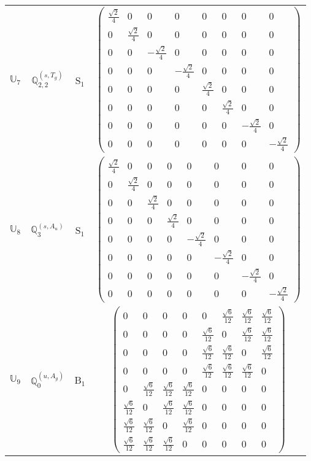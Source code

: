 \documentclass[fleqn,10pt,landscape]{article}
\begin{document}
\begin{itemize}
\begin{center}
\begin{longtable}{c|c|c|c}
$ \mathbb{U}_{7} $ & $\mathbb{Q}_{2,2}^{(s,T_{g})}$ & S$_{1}$ & $\begin{pmatrix} \frac{\sqrt{2}}{4} & 0 & 0 & 0 & 0 & 0 & 0 & 0 \\ 0 & \frac{\sqrt{2}}{4} & 0 & 0 & 0 & 0 & 0 & 0 \\ 0 & 0 & - \frac{\sqrt{2}}{4} & 0 & 0 & 0 & 0 & 0 \\ 0 & 0 & 0 & - \frac{\sqrt{2}}{4} & 0 & 0 & 0 & 0 \\ 0 & 0 & 0 & 0 & \frac{\sqrt{2}}{4} & 0 & 0 & 0 \\ 0 & 0 & 0 & 0 & 0 & \frac{\sqrt{2}}{4} & 0 & 0 \\ 0 & 0 & 0 & 0 & 0 & 0 & - \frac{\sqrt{2}}{4} & 0 \\ 0 & 0 & 0 & 0 & 0 & 0 & 0 & - \frac{\sqrt{2}}{4} \end{pmatrix}$ \\
$ \mathbb{U}_{8} $ & $\mathbb{Q}_{3}^{(s,A_{u})}$ & S$_{1}$ & $\begin{pmatrix} \frac{\sqrt{2}}{4} & 0 & 0 & 0 & 0 & 0 & 0 & 0 \\ 0 & \frac{\sqrt{2}}{4} & 0 & 0 & 0 & 0 & 0 & 0 \\ 0 & 0 & \frac{\sqrt{2}}{4} & 0 & 0 & 0 & 0 & 0 \\ 0 & 0 & 0 & \frac{\sqrt{2}}{4} & 0 & 0 & 0 & 0 \\ 0 & 0 & 0 & 0 & - \frac{\sqrt{2}}{4} & 0 & 0 & 0 \\ 0 & 0 & 0 & 0 & 0 & - \frac{\sqrt{2}}{4} & 0 & 0 \\ 0 & 0 & 0 & 0 & 0 & 0 & - \frac{\sqrt{2}}{4} & 0 \\ 0 & 0 & 0 & 0 & 0 & 0 & 0 & - \frac{\sqrt{2}}{4} \end{pmatrix}$ \\ \hline
$ \mathbb{U}_{9} $ & $\mathbb{Q}_{0}^{(u,A_{g})}$ & B$_{1}$ & $\begin{pmatrix} 0 & 0 & 0 & 0 & 0 & \frac{\sqrt{6}}{12} & \frac{\sqrt{6}}{12} & \frac{\sqrt{6}}{12} \\ 0 & 0 & 0 & 0 & \frac{\sqrt{6}}{12} & 0 & \frac{\sqrt{6}}{12} & \frac{\sqrt{6}}{12} \\ 0 & 0 & 0 & 0 & \frac{\sqrt{6}}{12} & \frac{\sqrt{6}}{12} & 0 & \frac{\sqrt{6}}{12} \\ 0 & 0 & 0 & 0 & \frac{\sqrt{6}}{12} & \frac{\sqrt{6}}{12} & \frac{\sqrt{6}}{12} & 0 \\ 0 & \frac{\sqrt{6}}{12} & \frac{\sqrt{6}}{12} & \frac{\sqrt{6}}{12} & 0 & 0 & 0 & 0 \\ \frac{\sqrt{6}}{12} & 0 & \frac{\sqrt{6}}{12} & \frac{\sqrt{6}}{12} & 0 & 0 & 0 & 0 \\ \frac{\sqrt{6}}{12} & \frac{\sqrt{6}}{12} & 0 & \frac{\sqrt{6}}{12} & 0 & 0 & 0 & 0 \\ \frac{\sqrt{6}}{12} & \frac{\sqrt{6}}{12} & \frac{\sqrt{6}}{12} & 0 & 0 & 0 & 0 & 0 \end{pmatrix}$ \\

\end{longtable}
\end{center}
\end{itemize}
\end{document}

